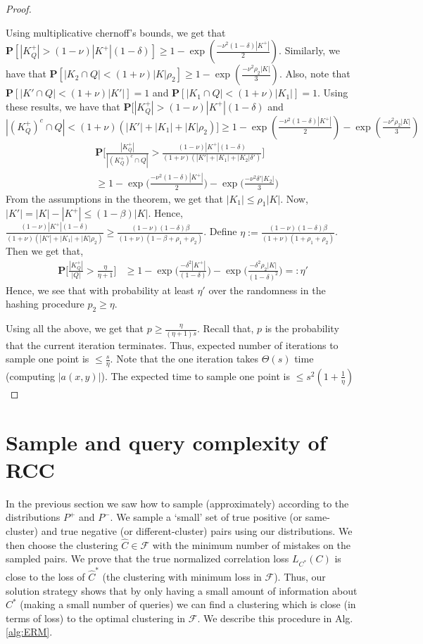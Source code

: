 \documentclass[12pt]{article}
\newcommand{\mb}{\mathbf}
\newcommand{\mc}{\mathcal}
\begin{document}
\begin{proof}
\begin{enumerate}[label=\textbf{T.\arabic*}]
Using multiplicative chernoff's bounds, we get that $\mb P[|K_Q^+| > (1-\nu)|K^+|(1-\delta) ] \ge 1 - \exp(\frac{-\nu^2 (1-\delta) |K^+|}{2})$. Similarly, we have that $\mb P[|K_2 \cap Q| < (1+\nu)|K| \rho_2] \ge 1 - \exp(\frac{-\nu^2 \rho_2 |K|}{3})$. Also, note that $\mb P[|K' \cap Q| < (1+\nu)|K'|] = 1$ and $\mb P[|K_1 \cap Q| < (1+\nu)|K_1|] = 1$. Using these results, we have that $\mb P[|K_Q^+| > (1-\nu)|K^+|(1-\delta)$ and $|(K^+_Q)^c \cap Q| < (1+\nu)(|K'|+|K_1|+|K|\rho_2)] \ge 1 - \exp(\frac{-\nu^2 (1-\delta) |K^+|}{2}) - \exp(\frac{-\nu^2 \rho_2 |K|}{3})$
\begin{align*}
  &\mb P\bigg[\frac{|K^+_Q|}{|(K^+_Q)^c \cap Q|} > \frac{(1-\nu)|K^+|(1-\delta)}{(1+\nu)(|K'|+|K_1|+|K_2|\delta')} \bigg] \\
  &\ge 1 - \exp\Big(\frac{-\nu^2 (1-\delta) |K^+|}{2}\Big) - \exp\Big(\frac{-\nu^2 \delta' |K_2|}{3}\Big)
\end{align*}
From the assumptions in the theorem, we get that $|K_1| \le \rho_1|K|$. Now, $|K'| = |K| - |K^+| \le (1-\beta)|K|$. Hence, $\frac{(1-\nu)|K^+|(1-\delta)}{(1+\nu)(|K'|+|K_1|+|K|\rho_2)} \ge \frac{(1-\nu)(1-\delta)\beta}{(1+\nu)(1-\beta + \rho_1 + \rho_2)}$. Define $\eta := \frac{(1-\nu)(1-\delta)\beta}{(1+\nu)(1 + \rho_1 + \rho_2)}$. Then we get that,
\begin{align*}
  \mb P\bigg[\frac{|K^+_Q|}{|Q|} > \frac{\eta}{\eta+1}\bigg] &\ge 1- \exp\Big(\frac{- \delta^2 |K^+|}{(1-\delta)}\Big) - \exp\Big(\frac{-\delta^2\rho_2 |K|}{(1-\delta)^2}\Big) =: \eta'
\end{align*}
Hence, we see that with probability at least $\eta'$ over the randomness in the hashing procedure $p_2 \ge \eta$.   
\end{enumerate}
Using all the above, we get that $p \ge \frac{\eta}{(\eta+1)s}$. Recall that, $p$ is the probability that the current iteration terminates. Thus, expected number of iterations to sample one point is $\le \frac{s}{\eta}$. Note that the one iteration takes $\Theta(s)$ time (computing $|a(x, y)|$). The expected time to sample one point is  $\le s^2(1 + \frac{1}{\eta})$ 
\end{proof}


\section{Sample and query complexity of RCC}
\label{section:sampleAndQueryComplexity}
In the previous section we saw how to sample (approximately) according to the distributions $P^+$ and $P^-$. We sample a `small' set of true positive (or same-cluster) and true negative (or different-cluster) pairs using our distributions. We then choose the clustering $\hat C \in \mc F$ with the minimum number of mistakes on the sampled pairs. We prove that the true normalized correlation loss $L_{C^*}(C)$ is close to the loss of $\hat C^*$ (the clustering with minimum loss in $\mc F$). Thus, our solution strategy shows that by only having a small amount of information about $C^*$ (making a small number of queries) we can find a clustering which is close (in terms of loss) to the optimal clustering in $\mc F$. We describe this procedure in Alg. \ref{alg:ERM}. 
\end{document}

